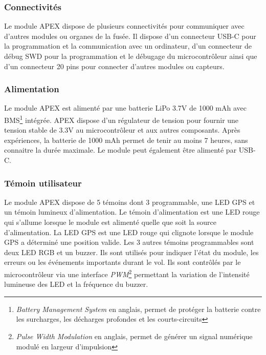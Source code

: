 \documentclass{article}
\newlength{\larg}
\begin{document}
\newpage

\subsubsection{Connectivités}

Le module APEX dispose de plusieurs connectivités pour communiquer avec d'autres modules ou
organes de la fusée. Il dispose d'un connecteur USB-C pour la programmation et la
communication avec un ordinateur, d'un connecteur de débug SWD pour la programmation et le
débugage du microcontrôleur ainsi que d'un connecteur 20 pins pour connecter d'autres
modules ou capteurs.

\subsubsection{Alimentation}

Le module APEX est alimenté par une batterie LiPo 3.7V de 1000 mAh avec BMS\footnote{
\textit{Battery Management System} en anglais, permet de protéger la batterie contre les
surcharges, les décharges profondes et les courts-circuits} intégrée. APEX dispose d'un
régulateur de tension pour fournir une tension stable de 3.3V au microcontrôleur et aux
autres composants. Après expériences, la batterie de 1000 mAh permet de tenir au moins 7 heures,
sans connaitre la durée maximale. Le module peut également être alimenté par USB-C.

\subsubsection{Témoin utilisateur}

Le module APEX dispose de 5 témoins dont 3 programmable, une LED GPS et un témoin lumineux
d'alimentation. Le témoin d'alimentation est une LED rouge qui s'allume lorsque le module est
alimenté quelle que soit la source d'alimentation. La LED GPS est une LED rouge qui clignote
lorsque le module GPS a déterminé une position valide. Les 3 autres témoins programmables sont
deux LED RGB et un buzzer. Ils sont utilisés pour indiquer l'état du module, les erreurs ou les
événements importants durant le vol. Ils sont contrôlés par le microcontrôleur via une interface
\textit{PWM}\footnote{\textit{Pulse Width Modulation} en anglais, permet de générer un signal
numérique modulé en largeur d'impulsion} permettant la variation de l'intensité lumineuse des LED
et la fréquence du buzzer.\\
\end{document}
